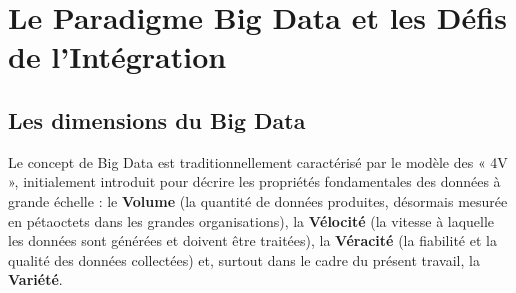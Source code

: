 \section{Le Paradigme Big Data et les Défis de l'Intégration}\label{sec:bigdata}
\subsection{Les dimensions du Big Data}
Le concept de Big Data est traditionnellement caractérisé par le modèle des « 4V », initialement introduit pour décrire les propriétés fondamentales des données à grande échelle : le \textbf{Volume} (la quantité de données produites, désormais mesurée en pétaoctets dans les grandes organisations), la \textbf{Vélocité} (la vitesse à laquelle les données sont générées et doivent être traitées), la \textbf{Véracité} (la fiabilité et la qualité des données collectées) et, surtout dans le cadre du présent travail, la \textbf{Variété}.


